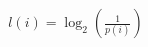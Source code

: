 \documentclass[preview]{standalone}
\begin{document}
\begin{align*}
l(i) = \log_2(\frac{1}{p(i)})
\end{align*}
\end{document}
